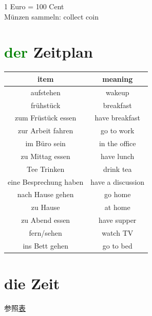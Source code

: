 1 Euro = 100 Cent \\
Münzen sammeln: collect coin \\

\section{\textcolor{green}{der} Zeitplan}
\begin{center}
    \begin{tabular} {|c|c|}
        \hline
        \rowcolor{gray}
        item                   & meaning           \\
        \hline
        aufstehen              & wakeup            \\
        \hline
        frühstück              & breakfast         \\
        zum Früstück essen     & have breakfast    \\
        \hline
        zur Arbeit fahren      & go to work        \\
        \hline
        im Büro sein           & in the office     \\
        \hline
        zu Mittag essen        & have lunch        \\
        \hline
        Tee Trinken            & drink tea         \\
        \hline
        eine Besprechung haben & have a discussion \\
        \hline
        nach Hause gehen       & go home           \\
        \hline
        zu Hause               & at home           \\
        \hline
        zu Abend essen         & have supper       \\
        \hline
        fern/sehen             & watch TV          \\
        \hline
        ins Bett gehen         & go to bed         \\
        \hline
    \end{tabular}
\end{center}

\section{die Zeit}

参照\hyperref[time:prep:summary]{表}
